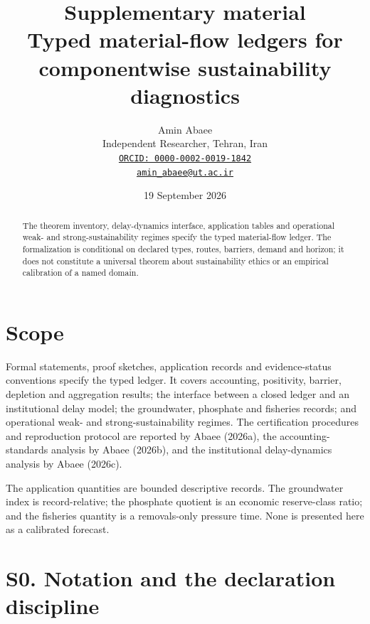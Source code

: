 \documentclass[11pt]{article}
\begin{document}
\title{Supplementary material\\
\large Typed material-flow ledgers for componentwise sustainability diagnostics}
\author{Amin Abaee\\[0.25em]
{\small Independent Researcher, Tehran, Iran}\\[0.25em]
{\small\href{https://orcid.org/0000-0002-0019-1842}{\nolinkurl{ORCID: 0000-0002-0019-1842}}}\\[0.25em]
{\small\href{mailto:amin_abaee@ut.ac.ir}{\nolinkurl{amin_abaee@ut.ac.ir}}}}
\date{19 September 2026}
\maketitle

\begin{abstract}
The theorem inventory, delay-dynamics interface, application tables and operational weak- and strong-sustainability regimes specify the typed material-flow ledger. The formalization is conditional on declared types, routes, barriers, demand and horizon; it does not constitute a universal theorem about sustainability ethics or an empirical calibration of a named domain.
\end{abstract}

\section*{Scope}

Formal statements, proof sketches, application records and evidence-status conventions specify the typed ledger. It covers accounting, positivity, barrier, depletion and aggregation results; the interface between a closed ledger and an institutional delay model; the groundwater, phosphate and fisheries records; and operational weak- and strong-sustainability regimes. The certification procedures and reproduction protocol are reported by Abaee (2026a), the accounting-standards analysis by Abaee (2026b), and the institutional delay-dynamics analysis by Abaee (2026c).

The application quantities are bounded descriptive records. The groundwater index is record-relative; the phosphate quotient is an economic reserve-class ratio; and the fisheries quantity is a removals-only pressure time. None is presented here as a calibrated forecast.

\section*{S0. Notation and the declaration discipline}
\end{document}
